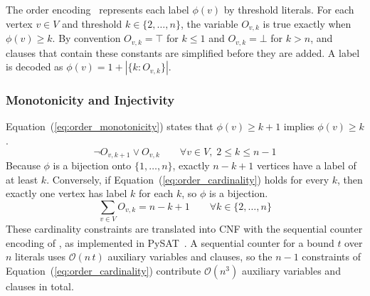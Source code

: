 \documentclass[a4paper,fleqn]{cas-sc}
\begin{document}
The order encoding~\citep{tamura2009} represents each label $\phi(v)$ by threshold literals. For each vertex $v\in V$ and threshold $k\in\{2,\dots,n\}$, the variable $O_{v,k}$ is true exactly when $\phi(v)\ge k$. By convention $O_{v,k}=\top$ for $k\le1$ and $O_{v,k}=\bot$ for $k>n$, and clauses that contain these constants are simplified before they are added. A label is decoded as $\phi(v)=1+|\{k : O_{v,k}\}|$.

\subsubsection{Monotonicity and Injectivity}
Equation~(\ref{eq:order_monotonicity}) states that $\phi(v)\ge k+1$ implies $\phi(v)\ge k$.
\begin{equation}
    \neg O_{v,k+1}\lor O_{v,k}\qquad\forall v\in V,\;2\le k\le n-1
    \label{eq:order_monotonicity}
\end{equation}
Because $\phi$ is a bijection onto $\{1,\dots,n\}$, exactly $n-k+1$ vertices have a label of at least $k$. Conversely, if Equation~(\ref{eq:order_cardinality}) holds for every $k$, then exactly one vertex has label $k$ for each $k$, so $\phi$ is a bijection.
\begin{equation}
    \sum_{v\in V}O_{v,k}=n-k+1\qquad\forall k\in\{2,\dots,n\}
    \label{eq:order_cardinality}
\end{equation}
These cardinality constraints are translated into CNF with the sequential counter encoding of \citet{sinz2005}, as implemented in PySAT~\citep{ignatiev2018}. A sequential counter for a bound $t$ over $n$ literals uses $\mathcal{O}(n\,t)$ auxiliary variables and clauses, so the $n-1$ constraints of Equation~(\ref{eq:order_cardinality}) contribute $\mathcal{O}(n^3)$ auxiliary variables and clauses in total.
\end{document}
